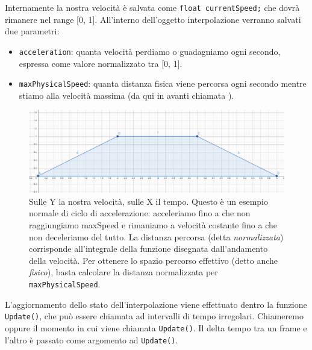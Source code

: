 \documentclass[main.tex]{subfiles}
\begin{document}
Internamente la nostra velocità è salvata come \lstinline{float currentSpeed;} che dovrà rimanere nel range [0, 1]. All'interno dell'oggetto interpolazione verranno salvati due parametri:
\begin{itemize}
    \item \lstinline{acceleration}: quanta velocità perdiamo o guadagniamo ogni secondo, espressa come valore normalizzato tra [0, 1].
    \item \lstinline{maxPhysicalSpeed}: quanta distanza fisica viene percorsa ogni secondo mentre stiamo alla velocità massima (da qui in avanti chiamata ).
\end{itemize}
\begin{figure}[H]
    \centering
    \includegraphics[width=1\linewidth]{img/interpolazione/normalSpeed.png}
    \caption{Sulle Y la nostra velocità, sulle X il tempo. Questo è un esempio normale di ciclo di accelerazione: acceleriamo fino a che non raggiungiamo maxSpeed e rimaniamo a velocità costante fino a che non deceleriamo del tutto. La distanza percorsa (detta \textit{normalizzata}) corrisponde all'integrale della funzione disegnata dall'andamento della velocità. Per ottenere lo spazio percorso effettivo (detto anche \textit{fisico}), basta calcolare la distanza normalizzata per \lstinline{maxPhysicalSpeed}.}
    \label{fig:4_normalSpeed}
\end{figure}

\noindent L'aggiornamento dello stato dell'interpolazione viene effettuato dentro la funzione \lstinline{Update()}, che può essere chiamata ad intervalli di tempo irregolari. Chiameremo  oppure  il momento in cui viene chiamata \lstinline{Update()}. Il delta tempo tra un frame e l'altro è passato come argomento ad \lstinline{Update()}.
\end{document}
